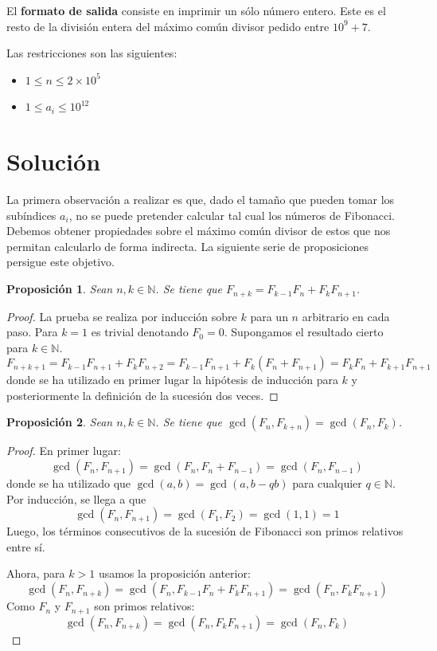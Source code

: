 \documentclass{article}
\theoremstyle{theorem-style}  %
\newtheorem{proposition}{Proposición}
\theoremstyle{definition}
\theoremstyle{example-style}
\begin{document}
    El \textbf{formato de salida} consiste en imprimir un sólo número entero. Este es el resto de la división entera del máximo común divisor pedido entre $10^9+7$.

    Las restricciones son las siguientes:
    \begin{itemize}
        \item $1 \leq n \leq 2 \times 10^5$
        \item $1 \leq a_i \leq 10^{12}$
    \end{itemize}

\section*{Solución}
    
    La primera observación a realizar es que, dado el tamaño que pueden tomar los subíndices $a_i$, no se puede pretender calcular tal cual los números de Fibonacci. Debemos obtener propiedades sobre el máximo común divisor de estos que nos permitan calcularlo de forma indirecta. La siguiente serie de proposiciones persigue este objetivo. 
    
    \begin{proposition}
        Sean $n, k \in \mathbb{N}$. Se tiene que $F_{n+k} = F_{k-1}F_n + F_k F_{n+1}$. 
    \end{proposition}
    \begin{proof}
        La prueba se realiza por inducción sobre $k$ para un $n$ arbitrario en cada paso. Para $k=1$ es trivial denotando $F_0 = 0$. Supongamos el resultado cierto para $k \in \mathbb{N}$. 
        $$ F_{n+k+1} = F_{k-1}F_{n+1} + F_k F_{n+2} = F_{k-1}F_{n+1} + F_k (F_{n} + F_{n+1}) = F_{k}F_n + F_{k+1} F_{n+1} $$
        donde se ha utilizado en primer lugar la hipótesis de inducción para $k$ y posteriormente la definición de la sucesión dos veces.
    \end{proof}
    
    \begin{proposition}
        Sean $n, k \in \mathbb{N}$. Se tiene que $\gcd(F_n, F_{k+n}) = \gcd(F_n, F_k)$. 
    \end{proposition}
    \begin{proof}
        En primer lugar: 
        $$ \gcd(F_n, F_{n+1}) = \gcd(F_{n}, F_{n}+F_{n-1}) = \gcd(F_{n}, F_{n-1}) $$
        donde se ha utilizado que $\gcd(a,b) = \gcd(a,b-qb)$ para cualquier $q \in \mathbb{N}$. Por inducción, se llega a que 
        $$ \gcd(F_n, F_{n+1}) = \gcd(F_{1}, F_{2}) = \gcd(1,1) = 1 $$
        Luego, los términos consecutivos de la sucesión de Fibonacci son primos relativos entre sí.
                
        Ahora, para $k > 1$ usamos la proposición anterior:
        $$ \gcd(F_n, F_{n+k}) = \gcd(F_n, F_{k-1}F_n + F_k F_{n+1}) = \gcd(F_n, F_k F_{n+1}) $$
        Como $F_n$ y $F_{n+1}$ son primos relativos:
        $$ \gcd(F_n, F_{n+k}) = \gcd(F_n, F_k F_{n+1}) = \gcd(F_n, F_k) $$
    \end{proof}
    
\end{document}
